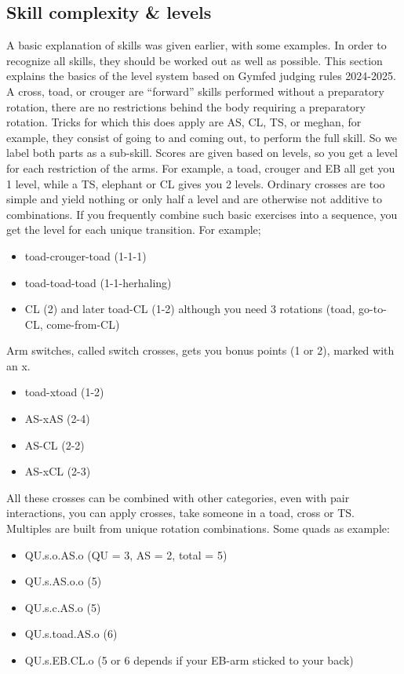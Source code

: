 \subsection{Skill complexity \& levels}
\label{subsec:skillcomplexiteit}

A basic explanation of skills was given earlier, with some examples. In order to recognize all skills, they should be worked out as well as possible. This section explains the basics of the level system based on Gymfed judging rules 2024-2025.
A cross, toad, or crouger are “forward” skills performed without a preparatory rotation, there are no restrictions behind the body requiring a preparatory rotation. Tricks for which this does apply are AS, CL, TS, or meghan, for example, they consist of going to and coming out, to perform the full skill. So we label both parts as a sub-skill. Scores are given based on levels, so you get a level for each restriction of the arms. For example, a toad, crouger and EB all get you 1 level, while a TS, elephant or CL gives you 2 levels.
Ordinary crosses are too simple and yield nothing or only half a level and are otherwise not additive to combinations. If you frequently combine such basic exercises into a sequence, you get the level for each unique transition. For example;


\begin{itemize}
    \item toad-crouger-toad (1-1-1)
    \item toad-toad-toad (1-1-herhaling)
    \item CL (2) and later toad-CL (1-2) although you need 3 rotations (toad, go-to-CL, come-from-CL)
\end{itemize}

Arm switches, called switch crosses, gets you bonus points (1 or 2), marked with an x.

\begin{itemize}
    \item toad-xtoad (1-2)
    \item AS-xAS (2-4)
    \item AS-CL (2-2)
    \item AS-xCL (2-3)
\end{itemize}

All these crosses can be combined with other categories, even with pair interactions, you can apply crosses, take someone in a toad, cross or TS.
Multiples are built from unique rotation combinations. Some quads as example:

\begin{itemize}
    \item QU.s.o.AS.o (QU = 3, AS = 2, total = 5)
    \item QU.s.AS.o.o (5)
    \item QU.s.c.AS.o (5)
    \item QU.s.toad.AS.o (6)
    \item QU.s.EB.CL.o (5 or 6 depends if your EB-arm sticked to your back)
\end{itemize}

